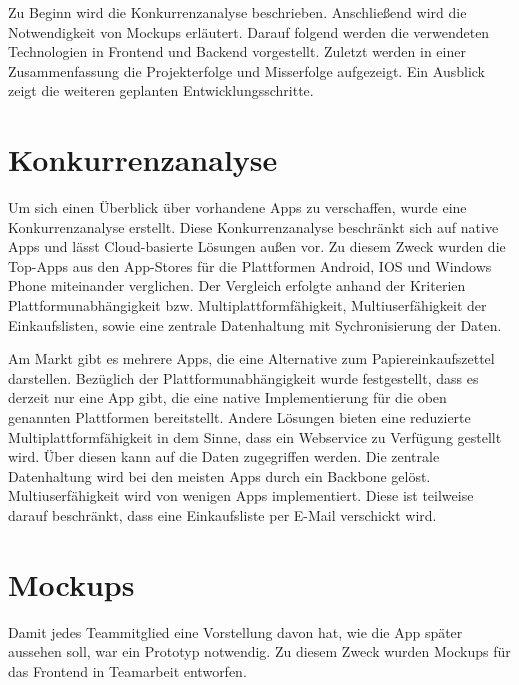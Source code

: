 \documentclass[10pt, conference, compsocconf]{IEEEtran}
\begin{document}
Zu Beginn wird die Konkurrenzanalyse beschrieben. 
Anschließend wird die Notwendigkeit von Mockups erl\"autert. 
Darauf folgend werden die verwendeten Technologien in Frontend und Backend vorgestellt. 
Zuletzt werden in einer Zusammenfassung die Projekterfolge und Misserfolge aufgezeigt.
Ein Ausblick zeigt die weiteren geplanten Entwicklungsschritte.

\section{Konkurrenzanalyse}
Um sich einen \"Uberblick \"uber vorhandene Apps zu verschaffen, wurde eine Konkurrenzanalyse erstellt.
Diese Konkurrenzanalyse beschr\"ankt sich auf native Apps und l\"asst Cloud-basierte L\"osungen au{\ss}en vor.
Zu diesem Zweck wurden die Top-Apps aus den App-Stores f\"ur die Plattformen Android, IOS und Windows Phone miteinander verglichen.
Der Vergleich erfolgte anhand der Kriterien Plattformunabh\"angigkeit bzw. Multiplattformf\"ahigkeit, Multiuserf\"ahigkeit der Einkaufslisten, sowie eine zentrale Datenhaltung mit Sychronisierung der Daten.

Am Markt gibt es mehrere Apps, die eine Alternative zum Papiereinkaufszettel darstellen.
Bez\"uglich der Plattformunabh\"angigkeit wurde festgestellt, dass es derzeit nur eine App gibt, die eine native Implementierung f\"ur die oben genannten Plattformen bereitstellt. 
Andere L\"osungen bieten eine reduzierte Multiplattformf\"ahigkeit in dem Sinne, dass ein Webservice zu Verf\"ugung gestellt wird.
\"Uber diesen kann auf die Daten zugegriffen werden.
Die zentrale Datenhaltung wird bei den meisten Apps durch ein Backbone gel\"ost.
Multiuserf\"ahigkeit wird von wenigen Apps implementiert. Diese ist teilweise darauf beschr\"ankt, dass eine Einkaufsliste per E-Mail verschickt wird.

\section{Mockups}
Damit jedes Teammitglied eine Vorstellung davon hat, wie die App sp\"ater aussehen soll, war ein Prototyp notwendig.
Zu diesem Zweck wurden Mockups f\"ur das Frontend in Teamarbeit entworfen. 
\end{document}
